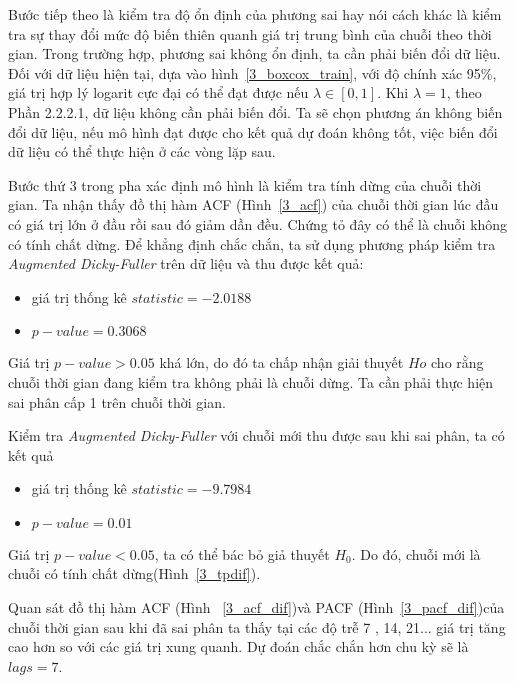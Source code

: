 Bước tiếp theo là kiểm tra độ ổn định của phương sai hay nói cách khác là kiểm tra sự thay đổi mức độ biến thiên quanh giá trị trung bình của chuỗi theo thời gian. Trong trường hợp, phương sai không ổn định, ta cần phải biến đổi dữ liệu. Đối với dữ liệu hiện tại, dựa vào hình~\ref{3_boxcox_train}, với độ chính xác 95\%, giá trị hợp lý logarit cực đại có thể đạt được nếu $\lambda \in [0,1]$. Khi $\lambda = 1$, theo Phần 2.2.2.1, dữ liệu không cần phải biến đổi. Ta sẽ chọn phương án không biến đổi dữ liệu, nếu mô hình đạt được cho kết quả dự đoán không tốt, việc biến đổi dữ liệu có thể thực hiện ở các vòng lặp sau.

Bước thứ 3 trong pha xác định mô hình là kiểm tra tính dừng của chuỗi thời gian.
Ta nhận thấy đồ thị hàm ACF (Hình~\ref{3_acf}) của chuỗi thời gian lúc đầu có giá trị lớn ở đầu rồi sau đó giảm dần đều. Chứng tỏ đây có thể là chuỗi không có tính chất dừng.
Để khẳng định chắc chắn, ta sử dụng phương pháp kiểm tra \textit{Augmented Dicky-Fuller} trên dữ liệu và thu được kết quả: 
\begin{itemize}
\item giá trị thống kê $statistic = -2.0188$
\item $p-value = 0.3068$
\end{itemize}  
Giá trị $p-value > 0.05$ khá lớn, do đó ta chấp nhận giải thuyết $Ho$ cho rằng chuỗi thời gian đang kiểm tra không phải là chuỗi dừng. Ta cần phải thực hiện sai phân cấp 1 trên chuỗi thời gian. 

Kiểm tra \textit{Augmented Dicky-Fuller} với chuỗi mới thu được sau khi sai phân, ta có kết quả
\begin{itemize}
\item giá trị thống kê $statistic = -9.7984$
\item $p-value = 0.01$
\end{itemize} 
Giá trị $p-value < 0.05$, ta có thể bác bỏ giả thuyết $H_0$. Do đó, chuỗi mới là chuỗi có tính chất dừng(Hình~\ref{3_tpdif}).

Quan sát đồ thị hàm ACF (Hình ~\ref{3_acf_dif})và PACF (Hình~\ref{3_pacf_dif})của chuỗi thời gian sau khi đã sai phân ta thấy tại các độ trễ 7 , 14, 21... giá trị tăng cao hơn so với các giá trị xung quanh. Dự đoán chắc chắn hơn chu kỳ sẽ là $lags=7$. 

